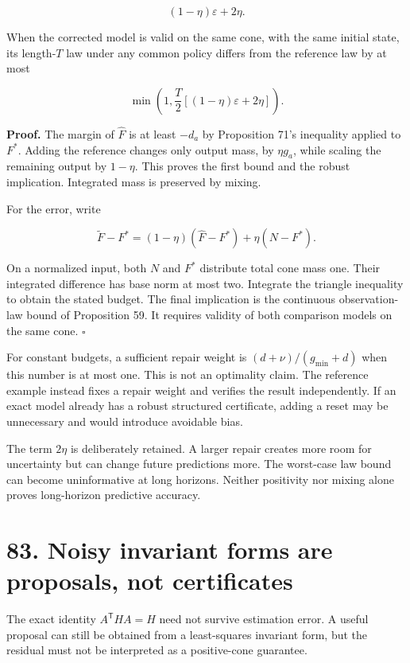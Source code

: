 \documentclass[11pt,letterpaper]{article}
\begin{document}
\[
\boxed{(1-\eta)\varepsilon+2\eta.}
\]

When the corrected model is valid on the same cone, with the same
initial state, its length-\(T\) law under any common policy differs from
the reference law by at most

\[
\min\left(1,\frac T2[(1-\eta)\varepsilon+2\eta]\right).
\]

\textbf{Proof.} The margin of \(\widehat F\) is at least \(-d_a\) by
Proposition 71's inequality applied to \(F^*\). Adding the reference
changes only output mass, by \(\eta g_a\), while scaling the remaining
output by \(1-\eta\). This proves the first bound and the robust
implication. Integrated mass is preserved by mixing.

For the error, write

\[
\widetilde F-F^*=(1-\eta)(\widehat F-F^*)+\eta(N-F^*).
\]

On a normalized input, both \(N\) and \(F^*\) distribute total cone mass
one. Their integrated difference has base norm at most two. Integrate
the triangle inequality to obtain the stated budget. The final
implication is the continuous observation-law bound of Proposition 59.
It requires validity of both comparison models on the same cone.
\(\square\)

For constant budgets, a sufficient repair weight is
\((d+\nu)/(g_{\min}+d)\) when this number is at most one. This is not an
optimality claim. The reference example instead fixes a repair weight
and verifies the result independently. If an exact model already has a
robust structured certificate, adding a reset may be unnecessary and
would introduce avoidable bias.

The term \(2\eta\) is deliberately retained. A larger repair creates
more room for uncertainty but can change future predictions more. The
worst-case law bound can become uninformative at long horizons. Neither
positivity nor mixing alone proves long-horizon predictive accuracy.

\section{83. Noisy invariant forms are proposals, not
certificates}\label{noisy-invariant-forms-are-proposals-not-certificates}

The exact identity \(A^{\mathsf T}HA=H\) need not survive estimation
error. A useful proposal can still be obtained from a least-squares
invariant form, but the residual must not be interpreted as a
positive-cone guarantee.
\end{document}
